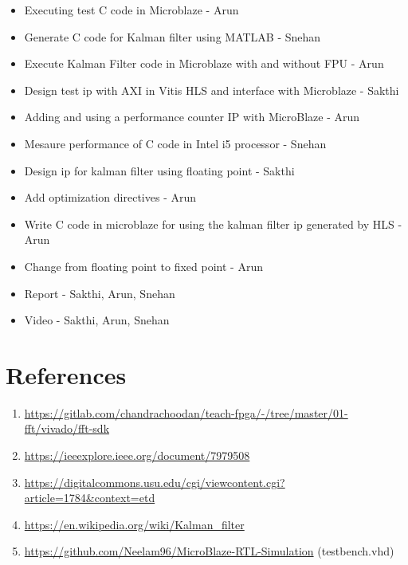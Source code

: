 \documentclass[11pt, a4paper]{article}
\begin{document}
\begin{itemize}
    \item Executing test C code in Microblaze - Arun
    \item Generate C code for Kalman filter using MATLAB - Snehan
    \item Execute Kalman Filter code in Microblaze with and without FPU - Arun
    \item Design test ip with AXI in Vitis HLS and interface with Microblaze - Sakthi
    \item Adding and using a performance counter IP with MicroBlaze - Arun
    \item Mesaure performance of C code in Intel i5 processor - Snehan
    \item Design ip for kalman filter using floating point - Sakthi
    \item Add optimization directives - Arun
    \item Write C code in microblaze for using the kalman filter ip generated by HLS - Arun
    \item Change from floating point to fixed point - Arun
    \item Report - Sakthi, Arun, Snehan
    \item Video - Sakthi, Arun, Snehan
\end{itemize}


\section{References}

\begin{enumerate}
    \item \url{https://gitlab.com/chandrachoodan/teach-fpga/-/tree/master/01-fft/vivado/fft-sdk}
    \item \url{https://ieeexplore.ieee.org/document/7979508} 
    \item \url{https://digitalcommons.usu.edu/cgi/viewcontent.cgi?article=1784&context=etd}
    \item \url{https://en.wikipedia.org/wiki/Kalman_filter}
    \item \url{https://github.com/Neelam96/MicroBlaze-RTL-Simulation} (testbench.vhd)
\end{enumerate}
\end{document}
